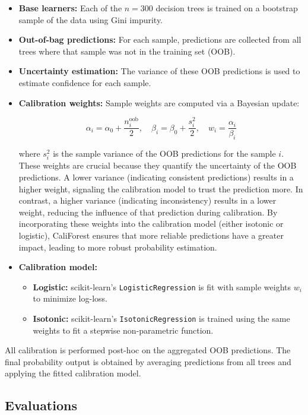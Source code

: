 \documentclass{article}
\begin{document}
\begin{itemize}
  \item \textbf{Base learners:} Each of the $n=300$ decision trees is trained on a bootstrap sample of the data using Gini impurity.
  \item \textbf{Out-of-bag predictions:} For each sample, predictions are collected from all trees where that sample was not in the training set (OOB).
  \item \textbf{Uncertainty estimation:} The variance of these OOB predictions is used to estimate confidence for each sample.
  \item \textbf{Calibration weights:} Sample weights are computed via a Bayesian update:

  \[
  \alpha_i = \alpha_0 + \frac{n^{\text{oob}}_i}{2}, \quad \beta_i = \beta_0 + \frac{s_i^2}{2}, \quad w_i = \frac{\alpha_i}{\beta_i}
  \]

  where $s_i^2$ is the sample variance of the OOB predictions for the sample $i$. These weights are crucial because they quantify the uncertainty of the OOB predictions. A lower variance (indicating consistent predictions) results in a higher weight, signaling the calibration model to trust the prediction more. In contrast, a higher variance (indicating inconsistency) results in a lower weight, reducing the influence of that prediction during calibration. By incorporating these weights into the calibration model (either isotonic or logistic), CaliForest ensures that more reliable predictions have a greater impact, leading to more robust probability estimation.

  \item \textbf{Calibration model:}
    \begin{itemize}
      \item \textbf{Logistic:} scikit-learn’s \texttt{LogisticRegression} is fit with sample weights $w_i$ to minimize log-loss.
      \item \textbf{Isotonic:} scikit-learn’s \texttt{IsotonicRegression} is trained using the same weights to fit a stepwise non-parametric function.
    \end{itemize}
\end{itemize}

All calibration is performed post-hoc on the aggregated OOB predictions. The final probability output is obtained by averaging predictions from all trees and applying the fitted calibration model.

\subsection*{Evaluations}
\end{document}
